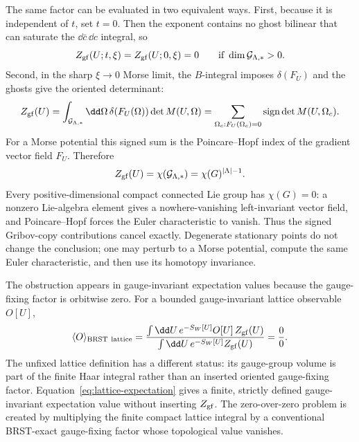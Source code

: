The same factor can be evaluated in two equivalent ways.  First, because it is
independent of \(t\), set \(t=0\).  Then the exponent contains no ghost bilinear
that can saturate the \(\dd\bar c\,\dd c\) integral, so
\begin{equation}
  Z_{\rm gf}(U;t,\xi)=Z_{\rm gf}(U;0,\xi)=0
  \qquad
  \text{if }\dim\mathcal G_{\Lambda,\ast}>0 .
  \label{eq:neuberger-zero-from-ghost-unsaturation}
\end{equation}
Second, in the sharp \(\xi\to0\) Morse limit, the \(B\)-integral imposes
\(\delta(F_U)\) and the ghosts give the oriented determinant:
\begin{equation}
  Z_{\rm gf}(U)
  =
  \int_{\mathcal G_{\Lambda,\ast}}
  \dd\Omega\,
  \delta(F_U(\Omega))\det M(U,\Omega)
  =
  \sum_{\Omega_c:F_U(\Omega_c)=0}
  \operatorname{sign}\det M(U,\Omega_c).
  \label{eq:neuberger-signed-gribov-copy-sum}
\end{equation}
For a Morse potential this signed sum is the Poincare--Hopf index of the
gradient vector field \(F_U\).  Therefore
\begin{equation}
  Z_{\rm gf}(U)
  =
  \chi(\mathcal G_{\Lambda,\ast})
  =
  \chi(G)^{|\Lambda|-1}.
  \label{eq:neuberger-euler-characteristic}
\end{equation}
Every positive-dimensional compact connected Lie group has
\(\chi(G)=0\): a nonzero Lie-algebra element gives a nowhere-vanishing
left-invariant vector field, and Poincare--Hopf forces the Euler
characteristic to vanish.  Thus the signed Gribov-copy contributions cancel
exactly.  Degenerate stationary points do not change the conclusion; one may
perturb to a Morse potential, compute the same Euler characteristic, and then
use its homotopy invariance.

The obstruction appears in gauge-invariant expectation values because the
gauge-fixing factor is orbitwise zero.  For a bounded gauge-invariant lattice
observable \(O[U]\),
\begin{equation}
  \langle O\rangle_{\rm BRST\ lattice}
  =
  \frac{
    \int\dd U\,e^{-S_W[U]}O[U]\,Z_{\rm gf}(U)
  }{
    \int\dd U\,e^{-S_W[U]}Z_{\rm gf}(U)
  }
  =
  \frac{0}{0}.
  \label{eq:neuberger-zero-over-zero}
\end{equation}
The unfixed lattice definition has a different status: its gauge-group volume
is part of the finite Haar integral rather than an inserted oriented
gauge-fixing factor.  Equation~\eqref{eq:lattice-expectation} gives a finite,
strictly defined gauge-invariant expectation value without inserting
\(Z_{\rm gf}\).  The zero-over-zero problem is created by multiplying the finite
compact lattice integral by a conventional BRST-exact gauge-fixing factor whose
topological value vanishes.

